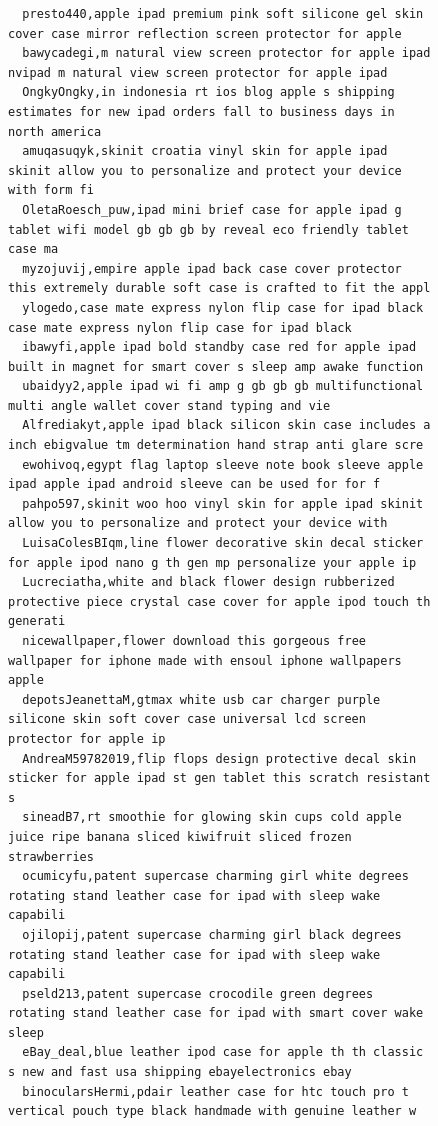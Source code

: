 \begin{figure}[htpb]
\begin{verbatim}
  presto440,apple ipad premium pink soft silicone gel skin cover case mirror reflection screen protector for apple
  bawycadegi,m natural view screen protector for apple ipad nvipad m natural view screen protector for apple ipad
  OngkyOngky,in indonesia rt ios blog apple s shipping estimates for new ipad orders fall to business days in north america
  amuqasuqyk,skinit croatia vinyl skin for apple ipad skinit allow you to personalize and protect your device with form fi
  OletaRoesch_puw,ipad mini brief case for apple ipad g tablet wifi model gb gb gb by reveal eco friendly tablet case ma
  myzojuvij,empire apple ipad back case cover protector this extremely durable soft case is crafted to fit the appl
  ylogedo,case mate express nylon flip case for ipad black case mate express nylon flip case for ipad black
  ibawyfi,apple ipad bold standby case red for apple ipad built in magnet for smart cover s sleep amp awake function
  ubaidyy2,apple ipad wi fi amp g gb gb gb multifunctional multi angle wallet cover stand typing and vie
  Alfrediakyt,apple ipad black silicon skin case includes a inch ebigvalue tm determination hand strap anti glare scre
  ewohivoq,egypt flag laptop sleeve note book sleeve apple ipad apple ipad android sleeve can be used for for f
  pahpo597,skinit woo hoo vinyl skin for apple ipad skinit allow you to personalize and protect your device with
  LuisaColesBIqm,line flower decorative skin decal sticker for apple ipod nano g th gen mp personalize your apple ip
  Lucreciatha,white and black flower design rubberized protective piece crystal case cover for apple ipod touch th generati
  nicewallpaper,flower download this gorgeous free wallpaper for iphone made with ensoul iphone wallpapers apple
  depotsJeanettaM,gtmax white usb car charger purple silicone skin soft cover case universal lcd screen protector for apple ip
  AndreaM59782019,flip flops design protective decal skin sticker for apple ipad st gen tablet this scratch resistant s
  sineadB7,rt smoothie for glowing skin cups cold apple juice ripe banana sliced kiwifruit sliced frozen strawberries
  ocumicyfu,patent supercase charming girl white degrees rotating stand leather case for ipad with sleep wake capabili
  ojilopij,patent supercase charming girl black degrees rotating stand leather case for ipad with sleep wake capabili
  pseld213,patent supercase crocodile green degrees rotating stand leather case for ipad with smart cover wake sleep
  eBay_deal,blue leather ipod case for apple th th classic s new and fast usa shipping ebayelectronics ebay
  binocularsHermi,pdair leather case for htc touch pro t vertical pouch type black handmade with genuine leather w

\end{verbatim}
\end{figure}
